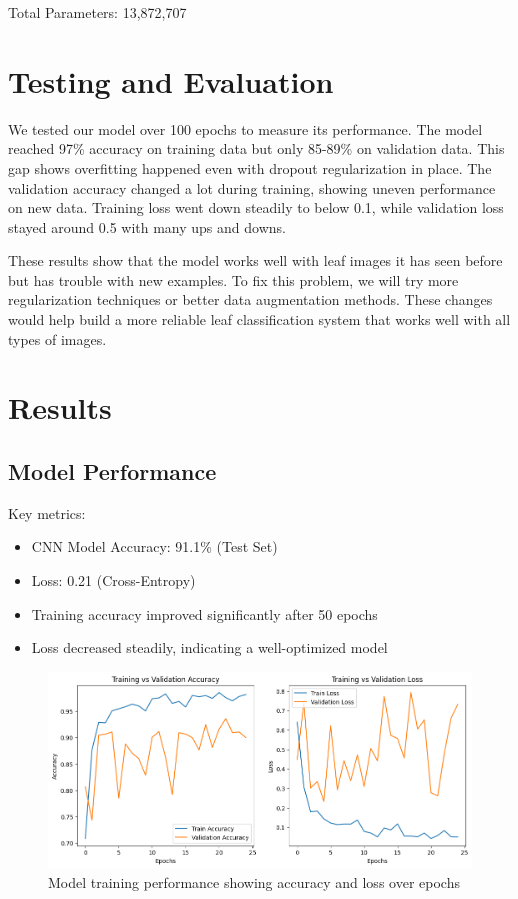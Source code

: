 \documentclass[twocolumn]{article}
\begin{document}
Total Parameters: 13,872,707

\section{Testing and Evaluation}
We tested our model over 100 epochs to measure its performance. The model reached 97\% accuracy on training data but only 85-89\% on validation data. This gap shows overfitting happened even with dropout regularization in place. The validation accuracy changed a lot during training, showing uneven performance on new data. Training loss went down steadily to below 0.1, while validation loss stayed around 0.5 with many ups and downs.

These results show that the model works well with leaf images it has seen before but has trouble with new examples. To fix this problem, we will try more regularization techniques or better data augmentation methods. These changes would help build a more reliable leaf classification system that works well with all types of images.

\section{Results}
\subsection{Model Performance}
Key metrics:
\begin{itemize}\itemsep4pt
    \item CNN Model Accuracy: 91.1\% (Test Set)
    \item Loss: 0.21 (Cross-Entropy)
    \item Training accuracy improved significantly after 50 epochs
    \item Loss decreased steadily, indicating a well-optimized model
\end{itemize}

\begin{figure}[H]
    \centering
    \includegraphics[width=\columnwidth]{AIML}
    \caption{Model training performance showing accuracy and loss over epochs}
    \label{fig:performance}
\end{figure}
\end{document}
